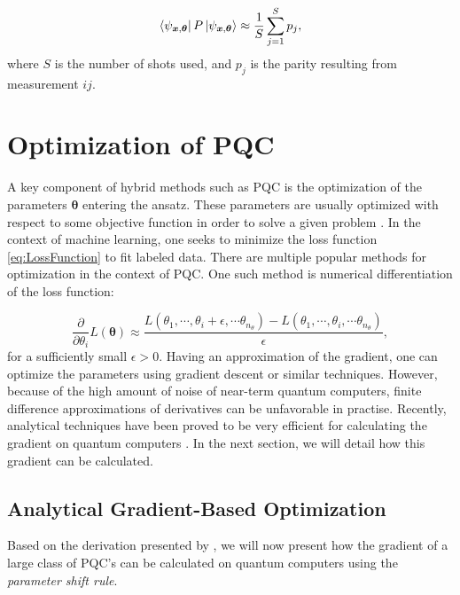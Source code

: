\begin{equation}
    \bra{\psi_{\boldsymbol{x},\boldsymbol{\theta}}}P 
    \ket{\psi_{\boldsymbol{x},\boldsymbol{\theta}}}
    \approx
    \frac{1}{S} \sum_{j=1}^S p_j,
\end{equation}
where $S$ is the number of shots used, and $p_j$ is the parity resulting from measurement $ij$.


\section{Optimization of PQC}\label{sec:OptPQC}
A key component of hybrid methods such as PQC is the optimization of the parameters $\boldsymbol{\theta}$ entering the ansatz. These parameters are usually optimized with respect to some objective function in order to solve a given problem \cite{Benedetti_2019}. In the context of machine learning, one seeks to minimize the loss function \autoref{eq:LossFunction} to fit labeled data. There are multiple popular methods for optimization in the context of PQC. One such method is numerical differentiation of the loss function:

\begin{equation}
    \frac{\partial}{\partial \theta_i} L(\boldsymbol{\theta}) 
    \approx \frac{L(\theta_1, \cdots, \theta_i + \epsilon, \cdots \theta_{n_{\theta}}) - L(\theta_1, \cdots, \theta_i, \cdots \theta_{n_{\theta}})}{\epsilon},
\end{equation}
for a sufficiently small $\epsilon>0$. Having an approximation of the gradient, one can optimize the parameters using gradient descent or similar techniques. However, because of the high amount of noise of near-term quantum computers, finite difference approximations of derivatives can be unfavorable in practise. Recently, analytical techniques have been proved to be very efficient for calculating the gradient on quantum computers \cite{abbas2020power} \cite{Benedetti_2019}. In the next section, we will detail how this gradient can be calculated. 

\subsection{Analytical Gradient-Based Optimization}\label{sec:AnalyticalGrad}
Based on the derivation presented by \cite{Schuld_2019}, we will now present how the gradient of a large class of PQC's can be calculated on quantum computers using the \emph{parameter shift rule}.


